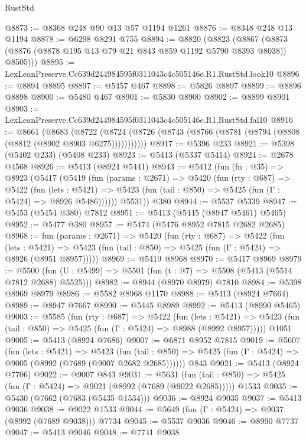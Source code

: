 \begin{lexlean}{RustStd}
\begin{coremodule}
@8873 := @8368 @248 @90 @13 @57 @1194 @1261
@8876 := @8348 @248 @13 @1194
@8878 := @6298 @8291 @755
@8894 := @8820
    (@8823 (@8867 (@8873 (@8876 (@8878 @195 @13 @79 @21 @843 @859 @1192 @5790 @8393 @8038)) @8505)))
@8895 := LexLeanPreserve.Cc639d244984595f0311043c4c505146e.R1.RustStd.look10
@8896 := @8894 @8895
@8897 := @5457 @467
@8898 := @5826 @8897
@8899 := @8896 @8898
@8900 := @5480 @467
@8901 := @5830 @8900
@8902 := @8899 @8901
@8903 := LexLeanPreserve.Cc639d244984595f0311043c4c505146e.R1.RustStd.fal10
@8916 := @8661
    (@8683
      (@8722 (@8724 (@8726 (@8743 (@8766 (@8781 (@8794 (@8808 (@8812 (@8902 @8903 @6275)))))))))))
@8917 := @5396 @233
@8921 := @5398 (@5402 @233) (@5408 @233)
@8923 := @5413 (@5337 @5414)
@8924 := @2678 @4568
@8926 := @5413 (@8924 @5441)
@8943 := @5412
    (fun (fn : @35) =>
    @8923
      (@5417
        (@5419
          (fun (params : @2671) =>
          @5420
            (fun (rty : @687) =>
            @5422
              (fun (lets : @5421) =>
              @5423 (fun (tail : @850) => @5425 (fun (Γ : @5424) => @8926 @5486))))))
        @5531))
    @380
@8944 := @5537 @5339
@8947 := @5453 (@5454 @380) @7812
@8951 := @5413 (@5445 (@8947 @5461) @5465)
@8952 := @5477 @380
@8957 := @5474 (@5476 @8952 @7815 @2682 @2685)
@8968 := fun (params : @2671) =>
  @5420
    (fun (rty : @687) =>
    @5422
      (fun (lets : @5421) =>
      @5423 (fun (tail : @850) => @5425 (fun (Γ : @5424) => @8926 (@8951 @8957)))))
@8969 := @5419 @8968
@8970 := @5417 @8969
@8979 := @5500 (fun (U : @5499) => @5501 (fun (t : @7) => @5508 (@5413 (@5514 @7812 @2688) @5525)))
@8982 := @8944 (@8970 @8979) @7810
@8984 := @5398 @8969 @8979
@8986 := @5582 @8968 @1170
@8988 := @5413 (@8924 @7664)
@8989 := @8947 @7667
@8990 := @5445 @8989
@8992 := @5413 (@8990 @5465)
@9003 := @5585
    (fun (rty : @687) =>
    @5422
      (fun (lets : @5421) =>
      @5423 (fun (tail : @850) => @5425 (fun (Γ : @5424) => @8988 (@8992 @8957)))))
    @1051
@9005 := @5413 (@8924 @7686)
@9007 := @6871 @8952 @7815
@9019 := @5607
    (fun (lets : @5421) =>
    @5423
      (fun (tail : @850) => @5425 (fun (Γ : @5424) => @9005 (@8992 (@7689 (@9007 @2682 @2685))))))
    @843
@9021 := @5413 (@8924 @7706)
@9022 := @9007 @843
@9031 := @5631
    (fun (tail : @850) => @5425 (fun (Γ : @5424) => @9021 (@8992 (@7689 (@9022 @2685)))))
    @1533
@9035 := @5430 (@7662 (@7683 (@5435 @1534)))
@9036 := @8924 @9035
@9037 := @5413 @9036
@9038 := @9022 @1533
@9044 := @5649 (fun (Γ : @5424) => @9037 (@8992 (@7689 @9038))) @7734
@9045 := @5537 @9036
@9046 := @8990 @7737
@9047 := @5413 @9046
@9048 := @7741 @9038

\end{coremodule}
\end{lexlean}
